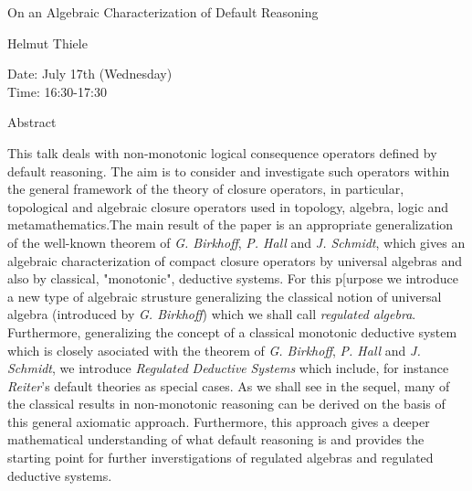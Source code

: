 \begin{center}
\LARGE
On an Algebraic Characterization of Default Reasoning 
\end{center}

\begin{center}
\Large
Helmut Thiele
\end{center}

\noindent
Date:  July 17th (Wednesday)\\
Time: 16:30-17:30\\

\begin{center}
\large
Abstract
\end{center}

This talk deals with non-monotonic logical consequence operators
defined by default reasoning.  The aim is to consider and investigate
such operators within the general framework of the theory of closure
operators, in particular, topological and algebraic closure operators
used in topology, algebra, logic and metamathematics.The main result
of the paper is an appropriate generalization of the well-known
theorem of {\it G. Birkhoff}, {\it P. Hall} and {\it J. Schmidt},
which gives an algebraic characterization of compact closure operators
by universal algebras and also by classical, "monotonic", deductive
systems.  For this p[urpose we introduce a new type of algebraic
strusture generalizing the classical notion of universal algebra
(introduced by {\it G. Birkhoff}) which we shall call {\it regulated
  algebra}.  Furthermore, generalizing the concept of a classical
monotonic deductive system which is closely asociated with the theorem
of {\it G.  Birkhoff}, {\it P. Hall} and {\it J. Schmidt}, we
introduce {\it Regulated} {\it Deductive} {\it Systems} which include,
for instance {\it Reiter}'s default theories as special cases.  As we shall
see in the sequel, many of the classical results in non-monotonic
reasoning can be derived on the basis of this general axiomatic
approach. Furthermore, this approach gives a deeper mathematical
understanding of what default reasoning is and provides the starting
point for further inverstigations of regulated algebras and regulated
deductive systems.

